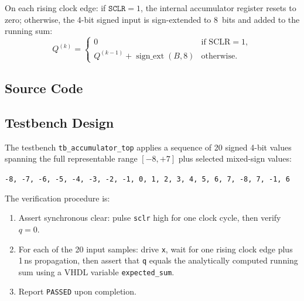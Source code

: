 \documentclass[12pt]{article}
\begin{document}
\noindent
On each rising clock edge: if $\texttt{SCLR} = 1$, the internal
accumulator register resets to zero; otherwise, the 4-bit signed input
is sign-extended to 8~bits and added to the running sum:
\begin{equation}
  Q^{(k)} = \begin{cases}
              0 & \text{if SCLR} = 1, \\
              Q^{(k-1)} + \operatorname{sign\_ext}(B, 8) & \text{otherwise.}
             \end{cases}
  \label{eq:accum}
\end{equation}

\subsection{Source Code}




\subsection{Testbench Design}
\label{sec:accumulator:tb}

The testbench \texttt{tb\_accumulator\_top} applies a sequence of 20
signed 4-bit values spanning the full representable range
$[-8, +7]$ plus selected mixed-sign values:

\begin{center}
\small
\texttt{-8, -7, -6, -5, -4, -3, -2, -1, 0, 1, 2, 3, 4, 5, 6, 7, -8, 7, -1, 6}
\end{center}

\noindent
The verification procedure is:
\begin{enumerate}[nosep]
  \item Assert synchronous clear: pulse \texttt{sclr} high for one
        clock cycle, then verify $q = 0$.
  \item For each of the 20 input samples: drive \texttt{x}, wait for one
        rising clock edge plus 1\,ns propagation, then assert that
        \texttt{q} equals the analytically computed running sum using a
        VHDL variable \texttt{expected\_sum}.
  \item Report \texttt{PASSED} upon completion.
\end{enumerate}


\end{document}
